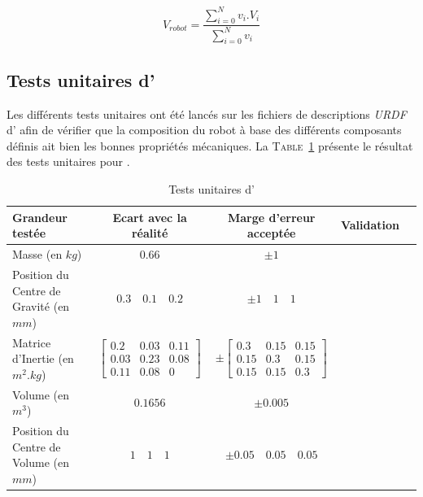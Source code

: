 				$$V_{robot} = \frac{\sum_{i=0}^{N}v_i.V_i}{\sum_{i=0}^{N}v_i}$$


		\subsection{Tests unitaires d'\argos{}}

			Les différents tests unitaires ont été lancés sur les fichiers de descriptions \textit{URDF} d'\argos{} afin de vérifier que la composition du robot à base des différents composants définis ait bien les bonnes propriétés mécaniques. La \textsc{Table}~\ref{table:argos_unittest} présente le résultat des tests unitaires pour \argos{}.
			
			\begin{table}[!htb]
				\centering
				\begin{adjustbox}{max width=\textwidth}
					\begin{tabular}{|l|c|c|c|c|}
						\hline
						\textbf{Grandeur testée} & \textbf{Ecart avec la réalité} & \textbf{Marge d'erreur acceptée} & \textbf{Validation} \\
						\hline
						Masse (en $kg$) & $0.66$ & $\pm 1$ & \cmark \\
						\hline
						Position du Centre de Gravité (en $mm$) & $0.3 \quad 0.1 \quad 0.2$ & $\pm 1 \quad 1 \quad 1$ & \cmark \\
						\hline
						Matrice d'Inertie (en $m^2.kg$) & $\begin{bmatrix}0.2 & 0.03 & 0.11 \\ 0.03 & 0.23 & 0.08 \\ 0.11 & 0.08 & 0\end{bmatrix}$ & $\pm \begin{bmatrix}0.3 & 0.15 & 0.15 \\ 0.15 & 0.3 & 0.15 \\ 0.15 & 0.15 & 0.3\end{bmatrix}$ & \cmark \\
						\hline
						Volume (en $m^3$) & $0.1656$ & $\pm 0.005$ & \cmark \\
						\hline
						Position du Centre de Volume (en $mm$) & $1 \quad 1 \quad 1$ & $\pm 0.05 \quad 0.05 \quad 0.05$ & \cmark \\
						\hline
					\end{tabular}
				\end{adjustbox}
				\caption{Tests unitaires d'\argos{}}
				\label{table:argos_unittest}
			\end{table}

